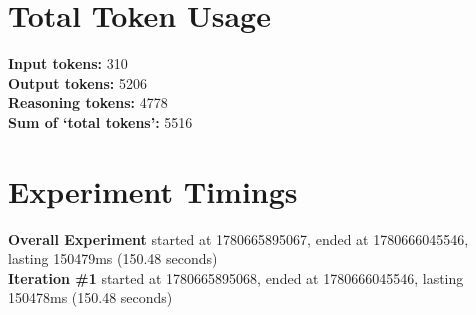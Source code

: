 \documentclass{article}
\begin{document}
\section*{Total Token Usage}
\textbf{Input tokens: }310
\\\textbf{Output tokens: }5206
\\\textbf{Reasoning tokens: }4778
\\\textbf{Sum of `total tokens': }5516
\section*{Experiment Timings}
\textbf{Overall Experiment} started at 1780665895067, ended at 1780666045546, lasting 150479ms (150.48 seconds)
\\\textbf{Iteration \#1} started at 1780665895068, ended at 1780666045546, lasting 150478ms (150.48 seconds)
\end{document}
